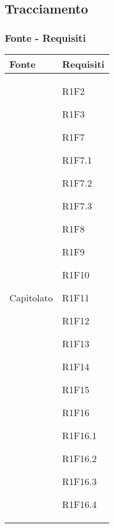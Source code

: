 \subsection{Tracciamento}
\subsubsection{Fonte - Requisiti}
\begin{center}
	\begin{longtable}{|p{44mm}|p{22mm}|}
		\hline
		\rowcolor{lighter-grayer}
		\textbf{Fonte} &  \textbf{Requisiti}  \\
		\hline
		\endhead
		

Capitolato &

R1F2 \newline

R1F3 \newline

R1F7 \newline

R1F7.1 \newline

R1F7.2 \newline

R1F7.3 \newline

R1F8 \newline

R1F9 \newline

R1F10 \newline

R1F11 \newline

R1F12 \newline

R1F13 \newline

R1F14 \newline

R1F15 \newline

R1F16 \newline

R1F16.1 \newline

R1F16.2 \newline

R1F16.3 \newline

R1F16.4 \newline


\end{longtable}
\end{center}
